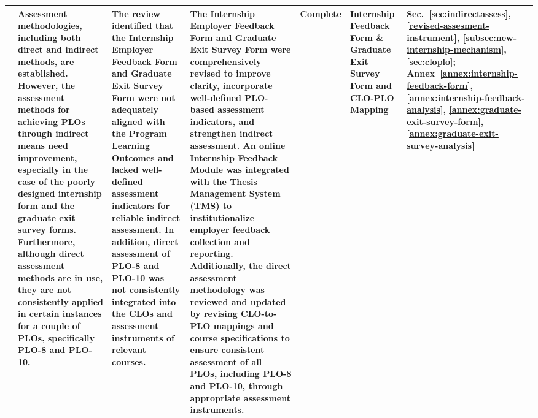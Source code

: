 \begin{landscape}
\begin{longtable}{|P{2.3cm}|P{5.0cm}|P{4.5cm}|P{5.0cm}|P{2.4cm}|P{2.8cm}|P{1.8cm}|}
 & Assessment methodologies, including both direct and indirect methods, are established. However, the assessment methods for achieving PLOs through indirect means need improvement, especially in the case of the poorly designed internship form and the graduate exit survey forms. Furthermore, although direct assessment methods are in use, they are not consistently applied in certain instances for a couple of PLOs, specifically PLO-8 and PLO-10. & The review identified that the Internship Employer Feedback Form and Graduate Exit Survey Form were not adequately aligned with the Program Learning Outcomes and lacked well-defined assessment indicators for reliable indirect assessment. In addition, direct assessment of PLO-8 and PLO-10 was not consistently integrated into the CLOs and assessment instruments of relevant courses. & The Internship Employer Feedback Form and Graduate Exit Survey Form were comprehensively revised to improve clarity, incorporate well-defined PLO-based assessment indicators, and strengthen indirect assessment. An online Internship Feedback Module was integrated with the Thesis Management System (TMS) to institutionalize employer feedback collection and reporting. Additionally, the direct assessment methodology was reviewed and updated by revising CLO-to-PLO mappings and course specifications to ensure consistent assessment of all PLOs, including PLO-8 and PLO-10, through appropriate assessment instruments. & Complete & Internship Feedback Form \& Graduate Exit Survey Form and CLO-PLO Mapping & Sec.~\ref{sec:indirectassess}, \ref{revised-assesment-instrument}, \ref{subsec:new-internship-mechanism}, \ref{sec:cloplo}; Annex~\ref{annex:internship-feedback-form}, \ref{annex:internship-feedback-analysis}, \ref{annex:graduate-exit-survey-form}, \ref{annex:graduate-exit-survey-analysis} \\ \hline

\end{longtable}
\end{landscape}
